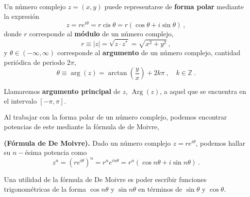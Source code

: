 \begin{defi}
    Un número complejo $z = (x,y)$ puede representarse de \textbf{forma polar} mediante la expresión
    \begin{equation}
        z = r e^{i\theta} = r \operatorname{cis}{\theta} = r(\cos \theta + i \sin \theta) \ ,
    \end{equation}
    donde $r$ corresponde al \textbf{módulo} de un número complejo, 
    \begin{equation}
        r \equiv |z| = \sqrt{z \cdot z^\ast} = \sqrt{x^2 + y^2} \ ,
    \end{equation}
    y $\theta \in (-\infty, \infty)$ corresponde al \textbf{argumento} de un número complejo, cantidad periódica de periodo $2\pi$,
    \begin{equation}
        \theta \equiv \arg{(z)} = \arctan\left( \frac{y}{x} \right) + 2k\pi \ , \quad k \in \mathbb{Z} \ . 
    \end{equation}

    Llamaremos \textbf{argumento principal} de $z$, $\operatorname{Arg}{(z)}$, a aquel que se encuentra en el intervalo $[-\pi, \pi]$.
\end{defi}

Al trabajar con la forma polar de un número complejo, podemos encontrar potencias de este mediante la fórmula de de Moivre,
\begin{teorema}{\textbf{(Fórmula de De Moivre).}}
    Dado un número complejo $z = re^{i\theta}$, podemos hallar su $n-$ésima potencia como 
    \begin{equation}
        z^n = \left( re^{i\theta} \right)^n = r^n e^{in \theta} = r^n (\cos{n\theta} + i \sin{n\theta}) \ .
    \end{equation}
\end{teorema}

Una utilidad de la fórmula de De Moivre es poder escribir funciones trigonométricas de la forma $\cos{n\theta}$ y $\sin{n\theta}$ en términos de $\sin{\theta}$ y $\cos{\theta}$.

